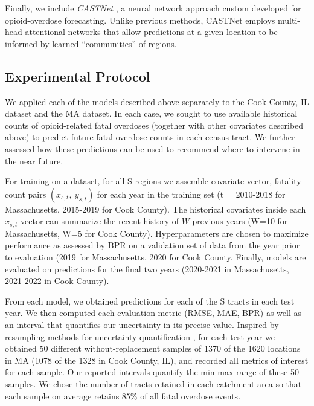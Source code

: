 Finally, we include \emph{CASTNet} \citep{ertugrulCASTNetCommunityAttentiveSpatioTemporal2019}, a neural network approach custom developed for opioid-overdose forecasting. Unlike previous methods, CASTNet employs multi-head attentional networks that allow predictions at a given location to be informed by learned ``communities'' of regions.

\subsection{Experimental Protocol}\label{experimental-protocol}

We applied each of the models described above separately to the Cook County, IL dataset and the MA dataset. In each case, we sought to use available historical counts of opioid-related fatal overdoses (together with other covariates described above) to predict future fatal overdose counts in each census tract. We further assessed how these predictions can be used to recommend where to intervene in the near future.

For training on a dataset, for all S regions we assemble covariate vector, fatality count pairs \((x_{s,t},\ y_{s,t})\) for each year in the training set (t = 2010-2018 for Massachusetts, 2015-2019 for Cook County). The historical covariates inside each \(x_{s,t}\) vector can summarize the recent history of \(W\) previous years (W=10 for Massachusetts, W=5 for Cook County). Hyperparameters are chosen to maximize performance as assessed by BPR on a validation set of data from the year prior to evaluation (2019 for Massachusetts, 2020 for Cook County. Finally, models are evaluated on predictions for the final two years (2020-2021 in Massachusetts, 2021-2022 in Cook County).

From each model, we obtained predictions for each of the S tracts in each test year. We then computed each evaluation metric (RMSE, MAE, BPR) as well as an interval that quantifies our uncertainty in its precise value. Inspired by resampling methods for uncertainty quantification \citep{hengl_spatial_2022}, for each test year we obtained 50 different without-replacement samples of 1370 of the 1620 locations in MA (1078 of the 1328 in Cook County, IL), and recorded all metrics of interest for each sample. Our reported intervals quantify the min-max range of these 50 samples. We chose the number of tracts retained in each catchment area so that each sample on average retains 85\% of all fatal overdose events.
